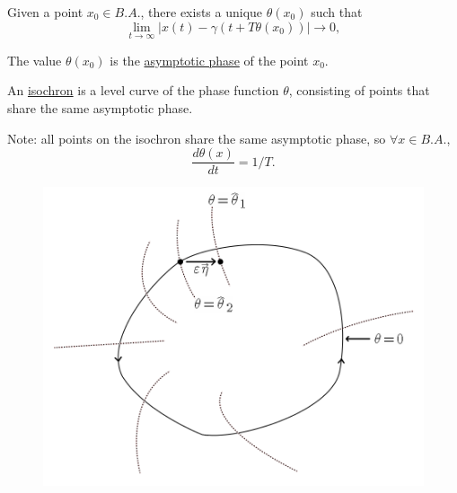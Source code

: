 \documentclass{beamer}
\begin{document}
  \begin{frame}
    \begin{definition}
  Given a point $x_0 \in B.A.$, there exists a unique $\theta(x_0)$ such that 
  \begin{equation}
    \lim_{t \rightarrow \infty} | x(t) - \gamma(t + T\theta(x_0))  | \rightarrow 0,
  \end{equation}
  
  The value $\theta(x_0)$ is the \underline{asymptotic phase} of the point $x_0$.

  \end{definition}

  \begin{definition}
  An \underline{isochron} is a level curve of the phase function $\theta$, consisting of points that share the same asymptotic phase.
  
%   
  \end{definition}
   Note: all points on the isochron share the same asymptotic phase, so $\forall x \in B.A.$,
  \begin{equation}
   \frac{d\theta(x)}{dt} = 1/T.
  \end{equation}
  
  \end{frame}
  
  \begin{frame}
  \begin{figure}
   \includegraphics[width=\textwidth]{isochron-demo.png}
  \end{figure}

   
  \end{frame}
\end{document}
